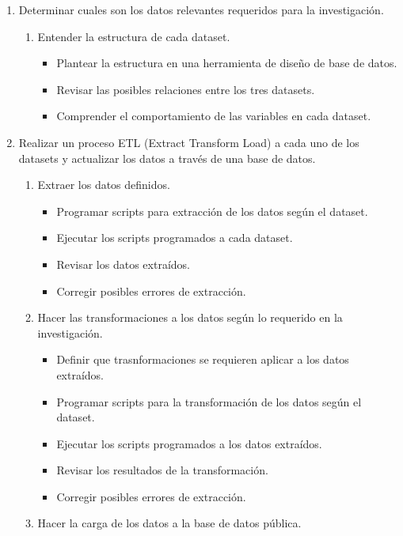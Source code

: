 \documentclass[a4paper, 11pt, oneside]{article}
\theoremstyle{definition}
\theoremstyle{remark}
\begin{document}
\begin{enumerate}
  \item Determinar cuales son los datos relevantes requeridos para la investigación.
    \begin{enumerate}
      \item Entender la estructura de cada dataset.
      \begin{itemize}
        \item Plantear la estructura en una herramienta de 			diseño de base de datos.
        \item Revisar las posibles relaciones entre los tres 		 datasets.
        \item Comprender el comportamiento de las variables en         cada dataset.
      \end{itemize}
  \end{enumerate}
  \item Realizar un proceso ETL (Extract Transform Load) a 	      cada uno de los datasets y actualizar los datos a través 	    de una base de datos.
  	\begin{enumerate}
      \item Extraer los datos definidos.
      \begin{itemize}
        \item Programar scripts para extracción de los datos           según el dataset.
        \item Ejecutar los scripts programados a cada dataset.
        \item Revisar los datos extraídos.
        \item Corregir posibles errores de extracción.
      \end{itemize}
      \item Hacer las transformaciones a los datos según lo         requerido en la investigación.
      \begin{itemize}
      	\item Definir que trasnformaciones se requieren               aplicar a los datos extraídos.
        \item Programar scripts para la transformación de los         datos según el dataset.
        \item Ejecutar los scripts programados a los datos             extraídos.
        \item Revisar los resultados de la transformación.
        \item Corregir posibles errores de extracción.
      \end{itemize}
      \item Hacer la carga de los datos a la base de datos           pública.

\end{enumerate}
\end{enumerate}
\end{document}
